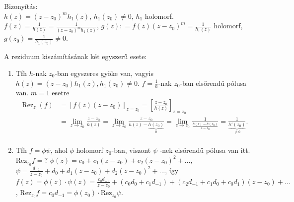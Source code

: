 \documentclass[12pt,a4paper]{scrartcl}
\providecommand{\tightlist}{%
  \setlength{\itemsep}{0pt}\setlength{\parskip}{0pt}}
\newenvironment{bizonyitas}{}{}
\begin{document}
\begin{bizonyitas}

Bizonyítás:\\
\(h\left( z \right) = \left( {z - z_{0}} \right)^{m}h_{1}\left( z \right)\),
\(h_{1}\left( z_{0} \right) \neq 0\), \(h_{1}\) holomorf.
\(f\left( z \right) = \frac{1}{h\left( z \right)} = \frac{1}{\left( {z - z_{0}} \right)^{m}h_{1}\left( z \right)}\),
\(g\left( z \right): = f\left( z \right)\left( {z - z_{0}} \right)^{m} = \frac{1}{h_{1}\left( z \right)}\)
holomorf,
\(g\left( z_{0} \right) = \frac{1}{h_{1}\left( z_{0} \right)} \neq 0\).

\end{bizonyitas}

A reziduum kiszámításának két egyszerű esete:

\begin{enumerate}
\def\labelenumi{\arabic{enumi}.}
\tightlist
\item
  Tfh \(h\)-nak \(z_{0}\)-ban egyszeres gyöke van, vagyis
  \(h\left( z \right) = \left( {z - z_{0}} \right)h_{1}\left( z \right),h_{1}\left( z_{0} \right) \neq 0\).
  \(f = \frac{1}{h}\)-nak \(z_{0}\)-ban elsőrendű pólusa van. \(m = 1\)
  esetre \[\begin{aligned}
    {{\text{Rez}}_{{z_0}}}\left( f \right) &  = {\left[ {f\left( z \right)\left( {z - {z_0}} \right)} \right]_{z = {z_0}}} = {\left[ {\frac{{z - {z_0}}}{{h\left( z \right)}}} \right]_{z = {z_0}}} \\ 
     &  = \mathop {\lim }\limits_{z \to {z_0}} \frac{{z - {z_0}}}{{h\left( z \right)}} = \mathop {\lim }\limits_{z \to {z_0}} \frac{{z - {z_0}}}{{h\left( z \right) - \underbrace {h\left( {{z_0}} \right)}_0}} = \mathop {\lim }\limits_{z \to {z_0}} \frac{1}{{\frac{{h\left( z \right) - h\left( {{z_0}} \right)}}{{z - {z_0}}}}} = \frac{1}{{\underbrace {h'\left( {{z_0}} \right)}_{ \ne 0}}}. \\ 
  \end{aligned} \]
\item
  Tfh \(f = \phi\psi\), ahol \(\phi\) holomorf \(z_{0}\)-ban, viszont
  \(\psi\) -nek elsőrendű pólusa van itt. \(\text{Rez}_{z_{0}}f = ?\)
  \(\phi\left( z \right) = c_{0} + c_{1}\left( {z - z_{0}} \right) + c_{2}\left( {z - z_{0}} \right)^{2} + ...\),
  \(\psi = \frac{d_{- 1}}{z - z_{0}} + d_{0} + d_{1}\left( {z - z_{0}} \right) + d_{2}\left( {z - z_{0}} \right)^{2} + ...\),
  így
  \(f(z) = \phi(z) \cdot \psi(z) = \frac{c_{0}d_{- 1}}{z - z_{0}} + (c_{0}d_{0} + c_{1}d_{- 1}) + (c_{2}d_{- 1} + c_{1}d_{0} + c_{0}d_{1})(z - z_{0}) + ...\),
  \(\text{Rez}_{z_{0}}f = c_{0}d_{- 1} = \phi(z_{0}) \cdot \text{Rez}_{z_{0}}\psi\).
\end{enumerate}
\end{document}
